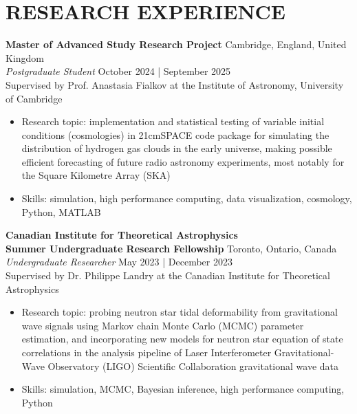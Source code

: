 \documentclass[a4paper,10pt]{extarticle}
\begin{document}
\section*{RESEARCH EXPERIENCE}
\textbf{Master of Advanced Study Research Project} \hfill Cambridge, England, United Kingdom\\
\textit{Postgraduate Student} \hfill October 2024 | September 2025\\
Supervised by Prof. Anastasia Fialkov at the Institute of Astronomy, University of Cambridge
\begin{itemize}
    \item Research topic: implementation and statistical testing of variable initial conditions (cosmologies) in 21cmSPACE code package for simulating the distribution of hydrogen gas clouds in the early universe, making possible efficient forecasting of future radio astronomy experiments, most notably for the Square Kilometre Array (SKA)
    
    \item Skills: simulation, high performance computing, data visualization, cosmology, Python, MATLAB
\end{itemize}

\textbf{Canadian Institute for Theoretical Astrophysics\\
    Summer Undergraduate Research Fellowship} \hfill Toronto, Ontario, Canada\\
\textit{Undergraduate Researcher} \hfill May 2023 | December 2023\\
Supervised by Dr. Philippe Landry at the Canadian Institute for Theoretical Astrophysics
\begin{itemize}
    \item Research topic: probing neutron star tidal deformability from gravitational wave signals using Markov chain Monte Carlo (MCMC) parameter estimation, and incorporating new models for neutron star equation of state correlations in the analysis pipeline of Laser Interferometer Gravitational-Wave Observatory (LIGO) Scientific Collaboration gravitational wave data

    \item Skills: simulation, MCMC, Bayesian inference, high performance computing, Python
\end{itemize}
\end{document}
